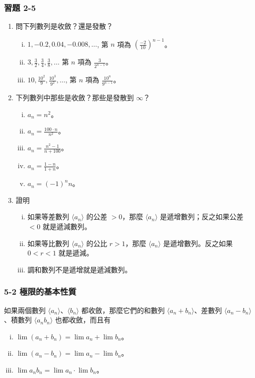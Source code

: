 \subsubsection*{習題 2-5}

\begin{enumerate}
    \item 問下列數列是收斂？還是發散？
    \begin{enumerate}[(i)]
        \item $1, -0.2, 0.04, -0.008, \dots$, 第 $n$ 項為 $(\frac{-2}{10})^{n-1}$。
        \item $3, \frac{3}{2}, \frac{3}{4}, \frac{3}{8}, \dots$ 第 $n$ 項為 $\frac{3}{2^{n-1}}$。
        \item $10, \frac{10^2}{9}, \frac{10^3}{9^2}, \dots$, 第 $n$ 項為 $\frac{10^n}{9^{n-1}}$。
    \end{enumerate}

    \item 下列數列中那些是收斂？那些是發散到 $\infty$？
    \begin{enumerate}[(i)]
        \item $a_n = n^2$。
        \item $a_n = \frac{100\cdot n}{n^2}$。
        \item $a_n = \frac{n^2-1}{n+100}$。
        \item $a_n = \frac{1-n}{1+n}$。
        \item $a_n = (-1)^n n$。
    \end{enumerate}

    \item 證明
    \begin{enumerate}[(i)]
        \item 如果等差數列 $\langle a_n \rangle$ 的公差 $>0$，那麼 $\langle a_n \rangle$ 是遞增數列；反之如果公差 $<0$ 就是遞減數列。
        \item 如果等比數列 $\langle a_n \rangle$ 的公比 $r>1$，那麼 $\langle a_n \rangle$ 是遞增數列。反之如果 $0<r<1$ 就是遞減。
        \item 調和數列不是遞增就是遞減數列。
    \end{enumerate}
\end{enumerate}

\subsubsection*{5-2 極限的基本性質}

如果兩個數列 $\langle a_n \rangle$、$\langle b_n \rangle$ 都收斂，那麼它們的和數列 $\langle a_n+b_n \rangle$、差數列 $\langle a_n-b_n \rangle$、積數列 $\langle a_n b_n \rangle$ 也都收斂，而且有
\begin{enumerate}[(i)]
    \item $\lim(a_n+b_n) = \lim a_n + \lim b_n$。
    \item $\lim(a_n-b_n) = \lim a_n - \lim b_n$。
    \item $\lim a_n b_n = \lim a_n \cdot \lim b_n$。
\end{enumerate}


